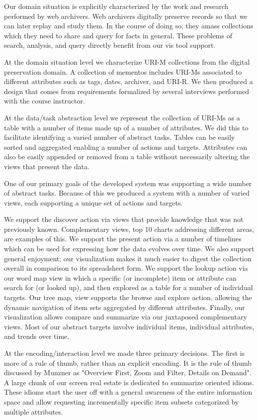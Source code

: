 \documentclass[10pt,journal,compsoc]{IEEEtran}
\begin{document}
Our domain situation is explicitly characterized by the work and research performed by web archivers. 
Web archivers digitally preserve records so that we can later replay and study them. 
In the course of doing so, they amass collections which they need to share and 
query for facts in general. These problems of search, analysis, and query directly 
benefit from our vis tool support. 

At the domain situation level we characterize URI-M collections from the digital preservation domain.
A collection of mementos includes URI-Ms associated to different attributes such as tags, dates, archiver, 
and URI-R. We then produced a design that comes from requirements formalized by several interviews performed 
with the course instructor.

At the data/task abstraction level we represent the collection of URI-Ms as a table
with a number of items made up of a number of attributes. We did this to facilitate 
identifying a varied number of abstract tasks. Tables can be easily sorted and aggregated
enabling a number of actions and targets. Attributes can also be easily appended or removed
from a table without necessarily altering the views that present the data.

One of our primary goals of the developed system was supporting a wide number of abstract tasks. Because of this
we produced a system with a number of varied views, each supporting a unique set of
actions and targets.

We support the discover action via views that provide knowledge that was not previously known.
Complementary views, top 10 charts addressing different areas, are examples of this. We support the present action via a number of timelines 
which can be used for expressing how the data evolves over time. 
We also support general enjoyment; our visualization makes it much easier to digest the
collection overall in comparison to its spreadsheet form. We support the 
lookup action via our word map view in which a specific (or incomplete) item or 
attribute can search for (or looked up), and then explored as a table for a number of individual
targets. Our tree map, view supports the browse and explore action, allowing the dynamic 
navigation of item sets aggregated by different attributes. Finally, our visualization allows 
compare and summarize via our juxtaposed complementary views. Most of our abstract targets
involve individual items, individual attributes, and trends over time.

At the encoding/interaction level we made three primary decisions. The first is 
more of a rule of thumb, rather than an explicit encoding. It is the rule of thumb 
discussed by Munzner as "Overview First, Zoom and Filter, Details on Demand". 
A large chunk of our screen real estate is dedicated to summarize oriented idioms. 
These idioms start the user off with a general awareness of the entire information space
and allow requesting incrementally specific item subsets categorized by multiple attributes.
\end{document}
